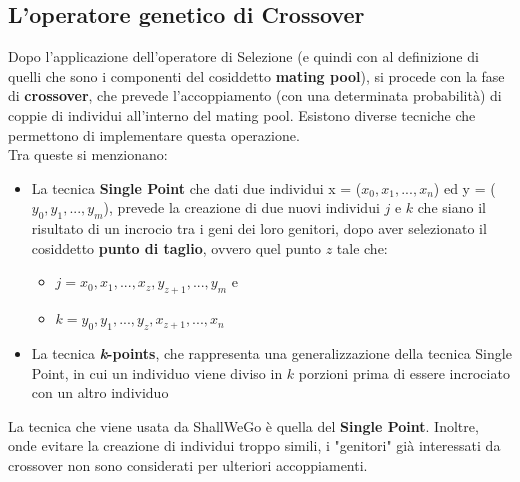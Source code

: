     \subsection{L'operatore genetico di Crossover}
        Dopo l'applicazione dell'operatore di Selezione (e quindi con al definizione di quelli che sono i componenti del cosiddetto \textbf{mating pool}), si procede con la fase di \textbf{crossover}, che prevede l'accoppiamento (con una determinata probabilità) di coppie di individui all'interno del mating pool. 
        Esistono diverse tecniche che permettono di implementare questa operazione. \\
        Tra queste si menzionano: \cite{}

        \begin{itemize}
            \item La tecnica \textbf{Single Point} che dati due individui x = ($x_{0}, x_{1}, ..., x_{n}$) ed y = ($y_{0}, y_{1}, ..., y_{m}$), prevede la creazione di due nuovi individui $j$ e $k$ che siano il risultato di un incrocio tra i geni dei loro genitori, dopo aver selezionato il cosiddetto \textbf{punto di taglio}, ovvero quel punto $z$ tale che:
                \begin{itemize}
                    \item $j = x_{0}, x_{1}, ..., x_{z}, y_{z+1}, ..., y_{m}$ e
                    \item $k = y_{0}, y_{1}, ..., y_{z}, x_{z+1}, ..., x_{n}$
                \end{itemize}
            \item La tecnica \textbf{\textit{k}-points}, che rappresenta una generalizzazione della tecnica Single Point, in cui un individuo viene diviso in \textit{$k$} porzioni prima di essere incrociato con un altro individuo
        \end{itemize}
        La tecnica che viene usata da ShallWeGo è quella del \textbf{Single Point}. Inoltre, onde evitare la creazione di individui troppo simili, i "genitori" già interessati da crossover non sono considerati per ulteriori accoppiamenti.
